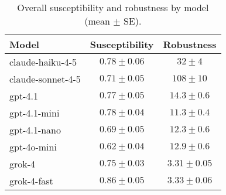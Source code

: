 \begin{table}[t]
  \centering
  \caption{Overall susceptibility and robustness by model (mean $\pm$ SE).}
  \label{tab:summary_by_model}
  \begin{tabular}{lcc}
    \toprule
    Model & Susceptibility & Robustness \\
    \midrule
    claude-haiku-4-5 & $0.78\pm 0.06$ & $32\pm 4$ \\
    claude-sonnet-4-5 & $0.71\pm 0.05$ & $108\pm 10$ \\
    gpt-4.1 & $0.77\pm 0.05$ & $14.3\pm 0.6$ \\
    gpt-4.1-mini & $0.78\pm 0.04$ & $11.3\pm 0.4$ \\
    gpt-4.1-nano & $0.69\pm 0.05$ & $12.3\pm 0.6$ \\
    gpt-4o-mini & $0.62\pm 0.04$ & $12.9\pm 0.6$ \\
    grok-4 & $0.75\pm 0.03$ & $3.31\pm 0.05$ \\
    grok-4-fast & $0.86\pm 0.05$ & $3.33\pm 0.06$ \\
    \bottomrule
  \end{tabular}
\end{table}
